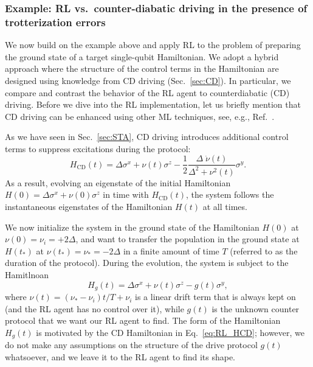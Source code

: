\subsubsection{\label{sec:RL_2q}Example: RL vs.~counter-diabatic driving in the presence of trotterization errors}


We now build on the example above and apply RL to the problem of preparing the ground state of a target single-qubit Hamiltonian. We adopt a hybrid approach where the structure of the control terms in the Hamiltonian are designed using knowledge from CD driving (Sec.~\ref{sec:CD}).
In particular, we compare and contrast the behavior of the RL agent to counterdiabatic (CD) driving. Before we dive into the RL implementation, let us briefly mention that CD driving can be enhanced using other ML techniques, see, e.g., Ref.~\cite{ferrer2023physics}. 

As we have seen in Sec.~\ref{sec:STA}, CD driving introduces additional control terms to suppress excitations during the protocol: 
\begin{equation}
\label{eq:RL_HCD}
    H_\text{CD}(t) = \Delta\sigma^x + \nu(t)\sigma^z - \frac{1}{2}\frac{\Delta\; \dot\nu(t)}{\Delta^2 + \nu^2(t)}\sigma^y.
\end{equation}
As a result, evolving an eigenstate of the initial Hamiltonian $H(0)=\Delta\sigma^x+\nu(0)\sigma^z$ in time with $H_\text{CD}(t)$, the system follows the instantaneous eigenstates of the Hamiltonian $H(t)$ at all times. 

We now initialize the system in the ground state of the Hamiltonian $H(0)$ at $\nu(0)=\nu_i=+2\Delta$, and want to transfer the population in the ground state at $H(t_\ast)$ at $\nu(t_\ast)=\nu_\ast=-2\Delta$ in a finite amount of time $T$ (referred to as the duration of the protocol). During the evolution, the system is subject to the Hamitlnoan
\begin{equation}
\label{eq:Hg}
    H_g(t) = \Delta\sigma^x + \nu(t)\sigma^z - g(t)\sigma^y,
\end{equation}
where $\nu(t) = (\nu_\ast-\nu_i)t/T + \nu_i$ is a linear drift term that is always kept on (and the RL agent has no control over it), while $g(t)$ is the unknown counter protocol that we want our RL agent to find. The form of the Hamiltonian $H_g(t)$ is motivated by the CD Hamiltonian in Eq.~\eqref{eq:RL_HCD}; however, we do not make any assumptions on the structure of the drive protocol $g(t)$ whatsoever, and we leave it to the RL agent to find its shape.

